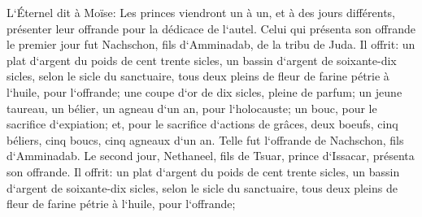 \verse L`Éternel dit à Moïse: Les princes viendront un à un, et à des jours différents, présenter leur offrande pour la dédicace de l`autel. 
\verse Celui qui présenta son offrande le premier jour fut Nachschon, fils d`Amminadab, de la tribu de Juda. 
\verse Il offrit: un plat d`argent du poids de cent trente sicles, un bassin d`argent de soixante-dix sicles, selon le sicle du sanctuaire, tous deux pleins de fleur de farine pétrie à l`huile, pour l`offrande; 
\verse une coupe d`or de dix sicles, pleine de parfum; 
\verse un jeune taureau, un bélier, un agneau d`un an, pour l`holocauste; 
\verse un bouc, pour le sacrifice d`expiation; 
\verse et, pour le sacrifice d`actions de grâces, deux boeufs, cinq béliers, cinq boucs, cinq agneaux d`un an. Telle fut l`offrande de Nachschon, fils d`Amminadab. 
\verse Le second jour, Nethaneel, fils de Tsuar, prince d`Issacar, présenta son offrande. 
\verse Il offrit: un plat d`argent du poids de cent trente sicles, un bassin d`argent de soixante-dix sicles, selon le sicle du sanctuaire, tous deux pleins de fleur de farine pétrie à l`huile, pour l`offrande; 
